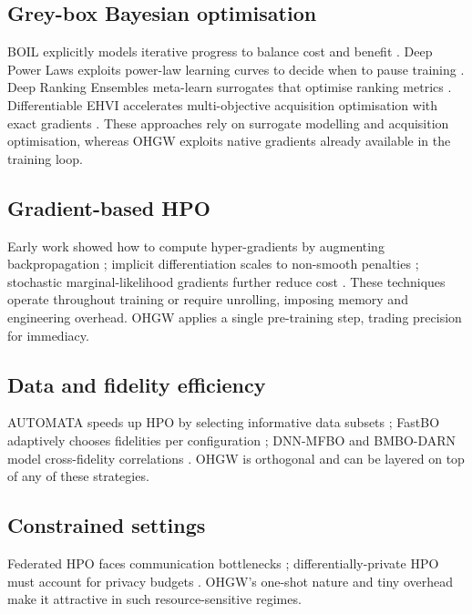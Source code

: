 \documentclass{article}
\begin{document}
\subsection{Grey-box Bayesian optimisation}
BOIL explicitly models iterative progress to balance cost and benefit \cite{nguyen-2019-bayesian}. Deep Power Laws exploits power-law learning curves to decide when to pause training \cite{kadra-2023-scaling}. Deep Ranking Ensembles meta-learn surrogates that optimise ranking metrics \cite{khazi-2023-deep}. Differentiable EHVI accelerates multi-objective acquisition optimisation with exact gradients \cite{daulton-2020-differentiable}. These approaches rely on surrogate modelling and acquisition optimisation, whereas OHGW exploits native gradients already available in the training loop.

\subsection{Gradient-based HPO}
Early work showed how to compute hyper-gradients by augmenting backpropagation \cite{chandra-2019-gradient}; implicit differentiation scales to non-smooth penalties \cite{bertrand-2020-implicit}; stochastic marginal-likelihood gradients further reduce cost \cite{immer-2023-stochastic}. These techniques operate throughout training or require unrolling, imposing memory and engineering overhead. OHGW applies a single pre-training step, trading precision for immediacy.

\subsection{Data and fidelity efficiency}
AUTOMATA speeds up HPO by selecting informative data subsets \cite{killamsetty-2022-automata}; FastBO adaptively chooses fidelities per configuration \cite{jiang-2024-efficient}; DNN-MFBO and BMBO-DARN model cross-fidelity correlations \cite{li-2020-multi,li-2021-batch}. OHGW is orthogonal and can be layered on top of any of these strategies.

\subsection{Constrained settings}
Federated HPO faces communication bottlenecks \cite{khodak-2021-federated}; differentially-private HPO must account for privacy budgets \cite{panda-2022-new,wang-2023-hypo}. OHGW's one-shot nature and tiny overhead make it attractive in such resource-sensitive regimes.
\end{document}
